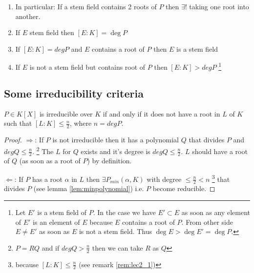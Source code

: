 \begin{remark}
  \begin{enumerate}
  \item In particular: If a stem field contains 2 roots of $P$ then
    $\exists!$  taking one root into
    another.
  \item If $E$ stem field then $\left[E:K\right] = \deg P$
  \item If $\left[E:K\right] = deg P$ and $E$ contains a root of $P$
    then $E$ is a stem field
  \item If $E$ is not a stem field but contains root of $P$ then
    $\left[E:K\right] > deg P$
    \footnote{
      Let $E'$ is a stem field of $P$. In the case we have
      $E' \subset E$ as soon as any element of $E'$ is an element of
      $E$ because $E$ contains a root of $P$.
      From other side $E \ne E'$ as soon as $E$ is not a stem field.
      Thus $\deg E > \deg E' = \deg P$.
    }
  \end{enumerate}
  \label{rem:lec2_1}
\end{remark}

\subsection{Some irreducibility criteria}

\begin{corollary}
  $P \in K\left[X\right]$ is irreducible over $K$ if and only if it
  does not have a root in  $L$ of $K$ such that
  $\left[L:K\right] \le \frac{n}{2}$, where $n = deg P$.
  \label{cor:lec2_1}
  \begin{proof}
    $\Rightarrow$: If $P$ is not irreducible then it has a polynomial $Q$ that
    divides $P$ and $deg Q \le \frac{n}{2}$.
    \footnote{
      $P = RQ$ and if
      $deg Q > \frac{n}{2}$ then we can take $R$ as $Q$
    }
    The
     $L$ for $Q$ exists and it's degree is $deg Q
    \le \frac{n}{2}$. $L$ should have a root of $Q$ (as soon as a root of
    $P$) by definition.

    $\Leftarrow$: If $P$ has a root $\alpha$ in $L$ then $\exists
    P_{min}\left(\alpha, K\right)$ with degree
    $\le \frac{n}{2} < n$
    \footnote{
      because
      $\left[L:K\right] \le \frac{n}{2}$
      (see remark
      \ref{rem:lec2_1})
    }
    that divides $P$ (see lemma \ref{lem:minpolynomial}) i.e. $P$
    become reducible. 
  \end{proof}
\end{corollary}

